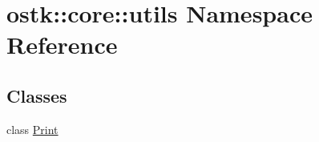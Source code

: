 \hypertarget{namespaceostk_1_1core_1_1utils}{}\section{ostk\+:\+:core\+:\+:utils Namespace Reference}
\label{namespaceostk_1_1core_1_1utils}
\subsection*{Classes}
\begin{DoxyCompactItemize}
\item 
class \hyperlink{classostk_1_1core_1_1utils_1_1_print}{Print}
\end{DoxyCompactItemize}
